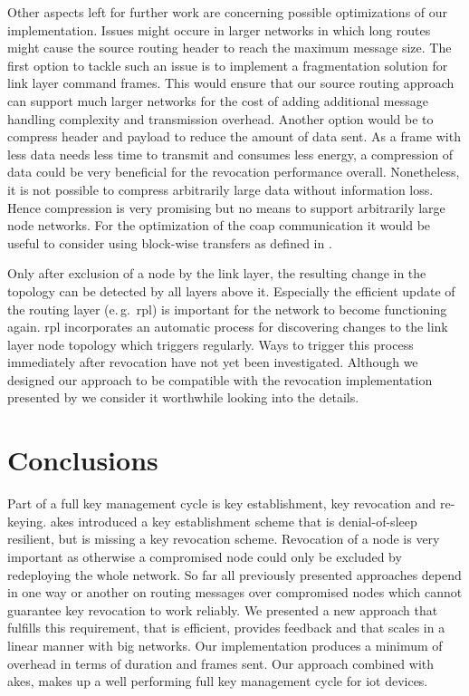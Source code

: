\documentclass[conference]{IEEEtran}
\begin{document}
Other aspects left for further work are concerning possible optimizations of our implementation. 
Issues might occure in larger networks in which long routes might cause the source routing header to reach the maximum message size. 
The first option to tackle such an issue is to implement a fragmentation solution for link layer command frames. 
This would ensure that our source routing approach can support much larger networks for the cost of adding additional message handling complexity and transmission overhead. 
Another option would be to compress header and payload to reduce the amount of data sent. 
As a frame with less data needs less time to transmit and consumes less energy, a compression of data could be very beneficial for the revocation performance overall. 
Nonetheless, it is not possible to compress arbitrarily large data without information loss. 
Hence compression is very promising but no means to support arbitrarily large node networks.
For the optimization of the \ac{coap} communication  it would be useful to consider using block-wise transfers as defined in \cite{rfc7959}.

Only after exclusion of a node by the link layer, the resulting change in the topology can be detected by all layers above it.
Especially the efficient update of the routing layer (e.\,g.~\ac{rpl}) is important for the network to become functioning again. 
\ac{rpl} incorporates an automatic process for discovering changes to the link layer node topology which triggers regularly. 
Ways to trigger this process immediately after revocation have not yet been investigated.
Although we designed our approach to be compatible with the revocation implementation presented by \citeauthor{DanielWerner} \cite{DanielWerner} we consider it worthwhile looking into the details.

\section{Conclusions}\label{sec:conclusion}
Part of a full key management cycle is key establishment, key revocation and re-keying. 
\ac{akes} introduced a key establishment scheme that is denial-of-sleep resilient, but is missing a key revocation scheme. 
Revocation of a node is very important as otherwise a compromised node could only be excluded by redeploying the whole network. 
So far all previously presented approaches depend in one way or another on routing messages over compromised nodes which cannot guarantee key revocation to work reliably. 
We presented a new approach that fulfills this requirement, that is efficient, provides feedback and that scales in a linear manner with big networks.
Our implementation produces a minimum of overhead in terms of duration and frames sent.
Our approach combined with \ac{akes}, makes up a well performing full key management cycle for \ac{iot} devices.
\end{document}
